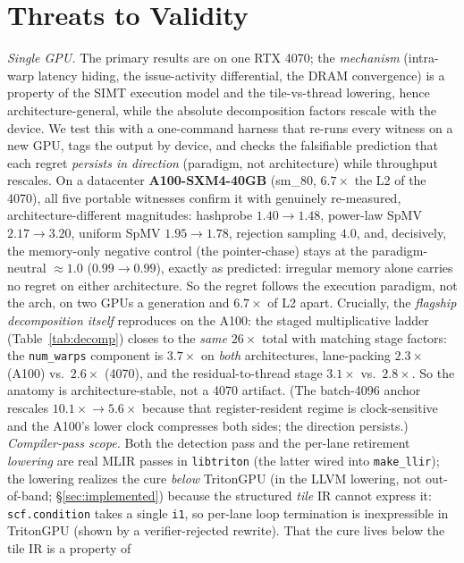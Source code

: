 \documentclass[manuscript,review,anonymous]{acmart}
\begin{document}
\section{Threats to Validity}
\emph{Single GPU.} The primary results are on one RTX 4070; the \emph{mechanism} (intra-warp latency
hiding, the issue-activity differential, the DRAM convergence) is a property of the SIMT execution model
and the tile-vs-thread lowering, hence architecture-general, while the absolute decomposition factors
rescale with the device. We test this with a one-command harness that re-runs every witness on a new GPU,
tags the output by device, and checks the falsifiable prediction that each regret \emph{persists in
direction} (paradigm, not architecture) while throughput rescales. On a datacenter \textbf{A100-SXM4-40GB}
(sm\_80, $6.7\times$ the L2 of the 4070), all five portable witnesses confirm it with genuinely
re-measured, architecture-different magnitudes: hashprobe $1.40\!\to\!1.48$, power-law SpMV
$2.17\!\to\!3.20$, uniform SpMV $1.95\!\to\!1.78$, rejection sampling $4.0$, and, decisively, the
memory-only negative control (the pointer-chase) stays at the paradigm-neutral $\approx\!1.0$
($0.99\!\to\!0.99$), exactly as predicted: irregular memory alone carries no regret on either
architecture. So the regret follows the execution paradigm, not the arch, on two GPUs a generation and
$6.7\times$ of L2 apart. Crucially, the \emph{flagship decomposition itself} reproduces on the A100: the staged multiplicative ladder (Table~\ref{tab:decomp}) closes to the \emph{same} $26\times$ total with matching stage factors: the \texttt{num\_warps} component is $3.7\times$ on \emph{both} architectures, lane-packing $2.3\times$ (A100) vs.\ $2.6\times$ (4070), and the residual-to-thread stage $3.1\times$ vs.\ $2.8\times$. So the anatomy is architecture-stable, not a 4070 artifact. (The batch-4096 anchor rescales $10.1\times\!\to\!5.6\times$ because that register-resident regime is clock-sensitive and the A100's lower clock compresses both sides; the direction persists.) \emph{Compiler-pass scope.} Both the detection pass and the per-lane
retirement \emph{lowering} are real MLIR passes in \texttt{libtriton} (the latter wired into
\texttt{make\_llir}); the lowering realizes the cure \emph{below} TritonGPU (in the LLVM lowering, not
out-of-band; \S\ref{sec:implemented}) because the structured \emph{tile} IR cannot express it:
\texttt{scf.condition} takes a single \texttt{i1}, so per-lane loop termination is inexpressible in
TritonGPU (shown by a verifier-rejected rewrite). That the cure lives below the tile IR is a property of
\end{document}
